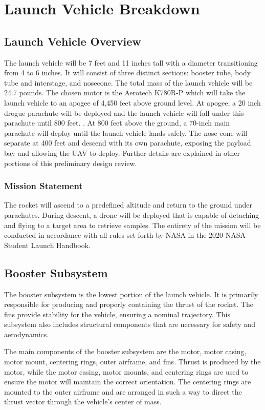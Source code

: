 \chapter{Launch Vehicle Breakdown}

\section{Launch Vehicle Overview}
The launch vehicle will be 7 feet and 11 inches tall with a diameter transitioning from 4 to 6 inches. It will consist of three distinct sections: booster tube, body tube and interstage, and nosecone. The total mass of the launch vehicle will be 24.7 pounds. The chosen motor is the Aerotech K780R-P which will take the launch vehicle to an apogee of 4,450 feet above ground level. At apogee, a 20 inch drogue parachute will be deployed and the launch vehicle will fall under this parachute until 800 feet. . At 800 feet above the ground, a 70-inch main parachute will deploy until the launch vehicle lands safely. The nose cone will separate at 400 feet and descend with its own parachute, exposing the payload bay and allowing the UAV to deploy. Further details are explained in other portions of this preliminary design review.

    \subsection{Mission Statement}
The rocket will ascend to a predefined altitude and return to the ground under parachutes. During descent, a drone will be deployed that is capable of detaching and flying to a target area to retrieve samples. The entirety of the mission will be conducted in accordance with all rules set forth by NASA in the 2020 NASA Student Launch Handbook.
   
    

\section{Booster Subsystem}
The booster subsystem is the lowest portion of the launch vehicle. It is primarily responsible for producing and properly containing the thrust of the rocket. The fins provide stability for the vehicle, ensuring a nominal trajectory. This subsystem also includes structural components that are necessary for safety and aerodynamics.

The main components of the booster subsystem are the motor, motor casing, motor mount, centering rings, outer airframe, and fins. Thrust is produced by the motor, while the motor casing, motor mounts, and centering rings are used to ensure the motor will maintain the correct orientation. The centering rings are mounted to the outer airframe and are arranged in such a way to direct the thrust vector through the vehicle’s center of mass.

